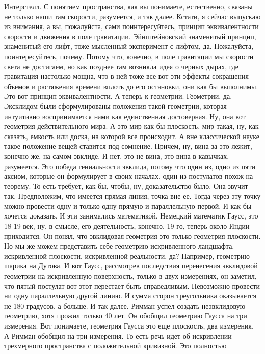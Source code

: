 Интерстелл. С понятием пространства, как вы понимаете, естественно, связаны не
только наши там скорости, разумеется, и так далее. Кстати, я сейчас выпускаю из
внимания, а вы, пожалуйста, сами поинтересуйтесь, принцип эквивалентности
скорости и движения в поле гравитации. Эйнштейновский знаменитый принцип,
знаменитый его лифт, тоже мысленный эксперимент с лифтом, да. Пожалуйста,
поинтересуйтесь, почему. Потому что, конечно, в поле гравитации мы скорости
света не достигаем, но как позднее там возникла идея о черных дырах, где
гравитация настолько мощна, что в ней тоже все вот эти эффекты сокращения
объемов и растяжения времени вплоть до его остановки, они как бы выполнимы. Это
вот принцип эквивалентности. А теперь к геометрии. Геометрии, да. Эксклидом были
сформулированы положения такой геометрии, которая интуитивно воспринимается нами
как единственная достоверная. Ну, она вот геометрия действительного мира. А это
мир как бы плоскость, мир такая, ну, как сказать, емкость или доска, на которой
все происходит. А вне классической науке такое положение вещей ставится под
сомнение. Причем, ну, вина за это лежит, конечно же, на самом эвклиде. И нет,
это не вина, это вина в кавычках, разумеется. Это победа гениальности эвклида,
потому что один из, одно из пяти аксиом, которые он формулирует в своих началах,
один из постулатов похож на теорему. То есть требует, как бы, чтобы, ну,
доказательство было. Она звучит так. Предположим, что имеется прямая линия,
точка вне ее. Тогда через эту точку можно провести одну и только одну прямую и
параллельную первой. И как бы хочется доказать. И эти занимались математикой.
Немецкий математик Гаусс, это 18-19 век, ну, в смысле, его деятельность,
конечно, 19-го, теперь около Индии приходится. Он понял, что эвклидовая
геометрия это только геометрия плоскости. Но мы же можем представить себе
геометрию искривленного ландшафта, искривленной плоскости, искривленной
реальности, да? Например, геометрию шарика на Дутова. И вот Гаусс, рассмотрев
последствия перенесения эвклидовой геометрии на искривленную поверхность, только
в двух измерениях, он заметил, что пятый постулат вот этот перестает быть
справедливым. Невозможно провести ни одну параллельную другой линию. И сумма
сторон треугольника оказывается не 180 градусов, а больше. И так далее. Римман
успел создать неэвклидовую геометрию, хотя прожил только 40 лет. Он обобщил
геометрию Гаусса на три измерения. Вот понимаете, геометрия Гаусса это еще
плоскость, два измерения. А Римман обобщил на три измерения. То есть речь идет
об искривлении трехмерного пространства с положительной кривизной. Это полностью
